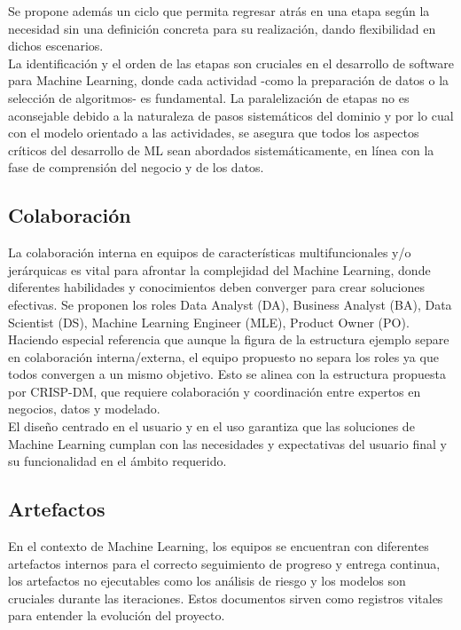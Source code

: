 \documentclass[journal]{IEEEtran}
\begin{document}
Se propone además un ciclo que permita regresar atrás en una etapa según la necesidad sin una definición concreta para su realización, dando flexibilidad en dichos escenarios.\\

La identificación y el orden de las etapas son cruciales en el desarrollo de software para Machine Learning, donde cada actividad -como la preparación de datos o la selección de algoritmos- es fundamental. La paralelización de etapas no es aconsejable debido a la naturaleza de pasos sistemáticos del dominio y por lo cual con el modelo orientado a las actividades, se asegura que todos los aspectos críticos del desarrollo de ML sean abordados sistemáticamente, en línea con la fase de comprensión del negocio y de los datos.\\


\subsection{Colaboración}

La colaboración interna en equipos de características multifuncionales y/o jerárquicas es vital para afrontar la complejidad del Machine Learning, donde diferentes habilidades y conocimientos deben converger para crear soluciones efectivas. Se proponen los roles Data Analyst (DA), Business Analyst (BA), Data Scientist (DS), Machine Learning Engineer (MLE), Product Owner (PO). Haciendo especial referencia que aunque la figura de la estructura ejemplo\cite{Cret2013} separe en colaboración interna/externa, el equipo propuesto no separa los roles ya que todos convergen a un mismo objetivo. Esto se alinea con la estructura propuesta por CRISP-DM, que requiere colaboración y coordinación entre expertos en negocios, datos y modelado.\\

El diseño centrado en el usuario y en el uso garantiza que las soluciones de Machine Learning cumplan con las necesidades y expectativas del usuario final y su funcionalidad en el ámbito requerido.

\subsection{Artefactos}

En el contexto de Machine Learning, los equipos se encuentran con diferentes artefactos internos para el correcto seguimiento de progreso y entrega continua, los artefactos no ejecutables como los análisis de riesgo y los modelos son cruciales durante las iteraciones. Estos documentos sirven como registros vitales para entender la evolución del proyecto.\\
\end{document}
